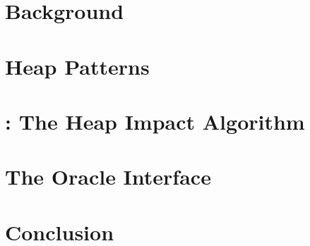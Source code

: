 \documentclass[12pt, letterpaper]{report}
\begin{document}
\chapter{Background}


\chapter{Heap Patterns}


\chapter{\verifier: The Heap Impact Algorithm}


\chapter{The Oracle Interface}


\chapter{Conclusion}


% 

% 

% 

% 

% 

% 


\small

\end{document}
